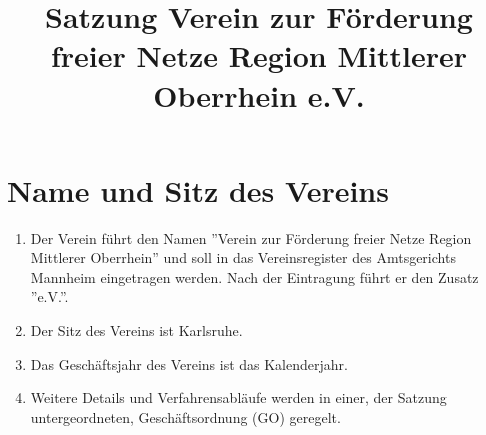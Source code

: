 \documentclass[12pt,a4paper,titlepage]{scrartcl}
\title{Satzung Verein zur Förderung freier Netze Region Mittlerer Oberrhein e.V.}
\begin{document}
\maketitle
{}
\thispagestyle{empty}
\newpage
{}
\setcounter{page}{1}

\section{Name und Sitz des Vereins}
\begin{enumerate}
\item Der Verein führt den Namen ''Verein zur Förderung freier Netze Region Mittlerer Oberrhein'' und soll in das Vereinsregister des Amtsgerichts Mannheim eingetragen werden. Nach der Eintragung führt er den Zusatz ''e.V.''.
\item Der Sitz des Vereins ist Karlsruhe.
\item Das Geschäftsjahr des Vereins ist das Kalenderjahr. 
\item Weitere Details und Verfahrensabläufe werden in einer, der Satzung untergeordneten, Geschäftsordnung (GO) geregelt. 
\end{enumerate}
\end{document}
